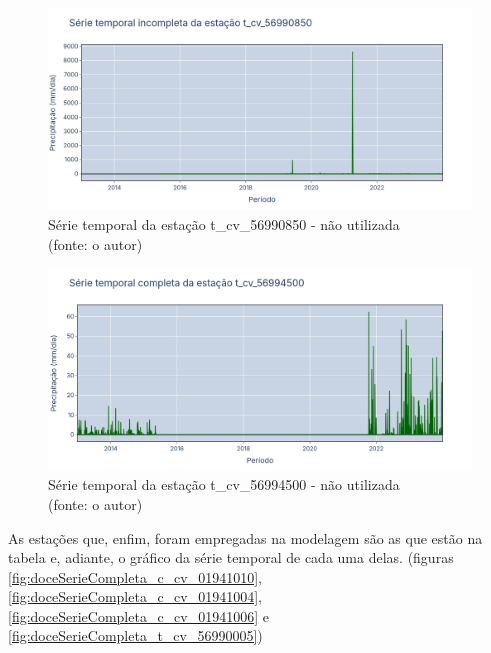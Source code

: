 \begin{figure}[!h]
	\centering
	\includegraphics[scale=0.25]{Figuras/rio_doce/doceSerieIncompleta_t_cv_56990850.png}
	\caption{Série temporal da estação t\_cv\_56990850 - não utilizada\\(fonte: o autor)}
	\label{fig:doceSerieIncompleta_t_cv_56990850}
\end{figure}

\begin{figure}[!h]
	\centering
	\includegraphics[scale=0.25]{Figuras/rio_doce/doceSerieCompleta_t_cv_56994500.png}
	\caption{Série temporal da estação t\_cv\_56994500 - não utilizada\\(fonte: o autor)}
	\label{fig:doceSerieCompleta_t_cv_56994500}
\end{figure}

As estações que, enfim, foram empregadas na modelagem são as que estão na tabela e, adiante, o gráfico da série temporal de cada uma delas. (figuras \ref{fig:doceSerieCompleta_c_cv_01941010}, \ref{fig:doceSerieCompleta_c_cv_01941004}, \ref{fig:doceSerieCompleta_c_cv_01941006} e \ref{fig:doceSerieCompleta_t_cv_56990005})

